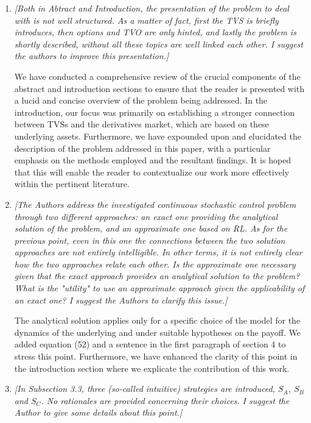 \documentclass{article}
\begin{document}
\begin{enumerate}

 \item \textit{[Both in Abtract and Introduction, the presentation of the problem to deal with is not well structured. As a matter of fact, first the TVS is briefly introduces, then options and TVO are only hinted, and lastly the problem is shortly described, without all these topics are well linked each other. I suggest the authors to improve this presentation.]}

 We have conducted a comprehensive review of the crucial components of the abstract and introduction sections to ensure that the reader is presented with a lucid and concise overview of the problem being addressed. In the introduction, our focus was primarily on establishing a stronger connection between TVSs and the derivatives market, which are based on these underlying assets. Furthermore, we have expounded upon and elucidated the description of the problem addressed in this paper, with a particular emphasis on the methods employed and the resultant findings. It is hoped that this will enable the reader to contextualize our work more effectively within the pertinent literature.

 \item \textit{[The Authors address the investigated continuous stochastic control problem through two different approaches: an exact one providing the analytical solution of the problem, and an approximate one based on RL. As for the previous point, even in this one the connections between the two solution approaches are not entirely intelligible. In other terms, it is not entirely clear how the two approaches relate each other. Is the approximate one necessary given that the exact approach provides an analytical solution to the problem? What is the "utility" to use an approximate approach given the applicability of an exact one? I suggest the Authors to clarify this issue.]} 
 
The analytical solution applies only for a specific choice of the model for the dynamics of the underlying and under suitable hypotheses on the payoff. We added equation (52) and a sentence in the first paragraph of section 4 to stress this point. Furthermore, we have enhanced the clarity of this point in the introduction section where we explicate the contribution of this work.

 \item \textit{[In Subsection 3.3, three (so-called intuitive) strategies are introduced, $S_A$, $S_B$ and $S_C$. No rationales are provided concerning their choices. I suggest the Author to give some details about this point.]}


\end{enumerate}
\end{document}
